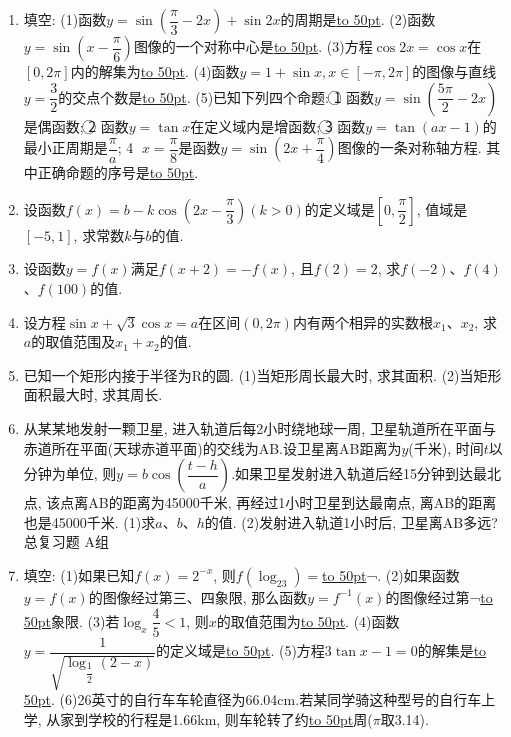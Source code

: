 \documentclass[10pt,a4paper]{article}
\newcommand{\blank}[1]{\underline{\hbox to #1pt{}}}
\newcommand{\bracket}[1]{(\hbox to #1pt{})}
\newcommand{\fourch}[4]{\par\begin{tabular}{p{.23\textwidth}p{.23\textwidth}p{.23\textwidth}p{.23\textwidth}}
A.~#1 &B.~#2& C.~#3& D.~#4
\end{tabular}}
\begin{document}
\begin{enumerate}[1.]
(3)函数$y=2\sin (3x-\dfrac{\pi }4)$的图像的两条相邻对称轴之间的距离为		\bracket{20}.
\fourch{$\dfrac{\pi }3$;}{$\dfrac{2\pi }3$;}{$\pi$;}{$\dfrac{4\pi }3$}
(4)``$a=1$''是``函数$y=\cos ^2ax-\sin ^2ax$的最小正周期为$\pi$''的		\bracket{20}.
\fourch{充分不必要条件;}{必要不充分条件;}{充要条件;}{既不充分也不必要条件}
(5)下列各式中正确的是											\bracket{20}.
\fourch{$\arcsin (-\dfrac 12)=\arccos \dfrac{\sqrt 3}2$;}{$\arccos (-\dfrac 12)=\arcsin \dfrac{\sqrt 3}2$;}{$\arctan (-1)=\arcsin (-1)$;}{$\arcsin (-\dfrac{\sqrt 2}2)+\arccos \dfrac{\sqrt 2}2=0$}
\item 填空:
(1)函数$y=\sin (\dfrac{\pi }3-2x)+\sin 2x$的周期是\blank{50}.
(2)函数$y=\sin (x-\dfrac{\pi }6)$图像的一个对称中心是\blank{50}.
(3)方程$\cos 2x=\cos x$在$[0,2\pi]$内的解集为\blank{50}.
(4)函数$y=1+\sin x,x\in [-\pi ,2\pi]$的图像与直线$y=\dfrac 32$的交点个数是\blank{50}.
(5)已知下列四个命题:
\textcircled{1} 函数$y=\sin (\dfrac{5\pi }2-2x)$是偶函数;
\textcircled{2} 函数$y=\tan x$在定义域内是增函数;
\textcircled{3} 函数$y=\tan (ax-1)$的最小正周期是$\dfrac{\pi }a$;
\textcircled{4} $x=\dfrac{\pi }8$是函数$y=\sin (2x+\dfrac{\pi }4)$图像的一条对称轴方程.
其中正确命题的序号是\blank{50}.
\item 设函数$f(x)=b-k\cos (2x-\dfrac{\pi }3)(k>0)$的定义域是$[0,\dfrac{\pi }2]$, 值域是$[-5,1]$, 求常数$k$与$b$的值.
\item 设函数$y=f(x)$满足$f(x+2)=-f(x)$, 且$f(2)=2$, 求$f(-2)$、$f(4)$、$f(100)$的值.
\item 设方程$\sin x+\sqrt 3\cos x=a$在区间$(0,2\pi)$内有两个相异的实数根$x_1$、$x_2$, 求$a$的取值范围及$x_1+x_2$的值.
\item 已知一个矩形内接于半径为R的圆.
(1)当矩形周长最大时, 求其面积.
(2)当矩形面积最大时, 求其周长.
\item 从某某地发射一颗卫星, 进入轨道后每2小时绕地球一周, 卫星轨道所在平面与赤道所在平面(天球赤道平面)的交线为AB.设卫星离AB距离为$y$(千米), 时间$t$以分钟为单位, 则$y=b\cos (\dfrac{t-h}a)$.如果卫星发射进入轨道后经15分钟到达最北点, 该点离AB的距离为45000千米, 再经过1小时卫星到达最南点, 离AB的距离也是45000千米.
(1)求$a$、$b$、$h$的值.
(2)发射进入轨道1小时后, 卫星离AB多远?
总复习题
A组
\item 填空:
(1)如果已知$f(x)=2^{-x}$, 则$f(\log _23)=$\blank{50}¬.
(2)如果函数$y=f(x)$的图像经过第三、四象限, 那么函数$y=f^{-1}(x)$的图像经过第¬\blank{50}象限.
(3)若$\log _x\dfrac 45<1$, 则$x$的取值范围为\blank{50}.
(4)函数$y=\dfrac 1{\sqrt {\log _{\dfrac 12}(2-x)}}$的定义域是\blank{50}.
(5)方程$3\tan x-1=0$的解集是\blank{50}.
(6)26英寸的自行车车轮直径为66.04cm.若某同学骑这种型号的自行车上学, 从家到学校的行程是1.66km, 则车轮转了约\blank{50}周($\pi$取3.14).

\end{enumerate}
\end{document}
